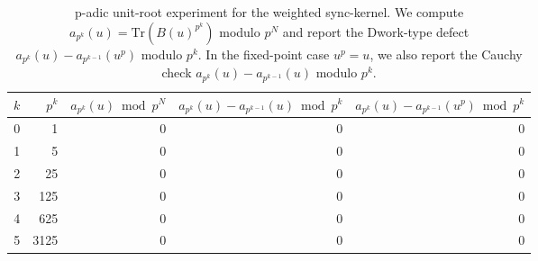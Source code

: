 \begin{table}[H]
\centering
\scriptsize
\setlength{\tabcolsep}{6pt}
\caption{p-adic unit-root experiment for the weighted sync-kernel. We compute $a_{p^k}(u)=\mathrm{Tr}(B(u)^{p^k})$ modulo $p^N$ and report the Dwork-type defect $a_{p^k}(u)-a_{p^{k-1}}(u^p)$ modulo $p^k$. In the fixed-point case $u^p=u$, we also report the Cauchy check $a_{p^k}(u)-a_{p^{k-1}}(u)$ modulo $p^k$.}
\label{tab:sync_kernel_weighted_padic_unit_root}
\begin{tabular}{r r r r r}
\toprule
$k$ & $p^k$ & $a_{p^k}(u)\bmod p^N$ & $a_{p^k}(u)-a_{p^{k-1}}(u)\bmod p^k$ & $a_{p^k}(u)-a_{p^{k-1}}(u^p)\bmod p^k$\\
\midrule
0 & 1 & 0 & 0 & 0\\
1 & 5 & 0 & 0 & 0\\
2 & 25 & 0 & 0 & 0\\
3 & 125 & 0 & 0 & 0\\
4 & 625 & 0 & 0 & 0\\
5 & 3125 & 0 & 0 & 0\\
\bottomrule
\end{tabular}
\end{table}
